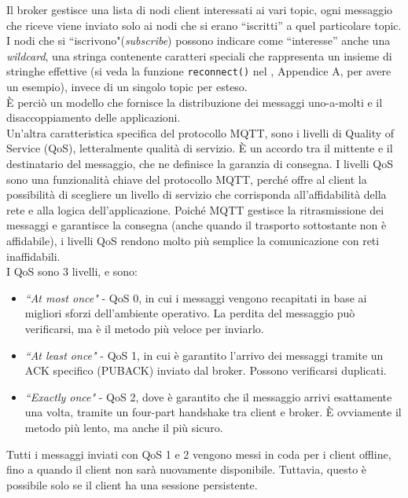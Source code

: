 \documentclass[12pt,a4paper]{report}
\begin{document}
Il broker gestisce una lista di nodi client interessati ai vari topic, ogni messaggio che riceve viene inviato solo ai nodi che si erano “iscritti” a quel particolare topic. I nodi che si ``iscrivono"(\textit{subscribe}) possono indicare come “interesse” anche una \textit{wildcard}, una stringa contenente caratteri speciali che rappresenta un insieme di stringhe effettive (si veda la funzione \texttt{reconnect()} nel , Appendice A, per avere un esempio), invece di un singolo topic per esteso.\\
È perciò un modello che fornisce la distribuzione dei messaggi uno-a-molti e il disaccoppiamento delle applicazioni.\\

Un'altra caratteristica specifica del protocollo MQTT, sono i livelli di Quality of Service (QoS), letteralmente qualità di servizio. 
È un accordo tra il mittente e il destinatario del messaggio, che ne definisce la garanzia di consegna.
I livelli QoS sono una funzionalità chiave del protocollo MQTT, perché offre al client la possibilità di scegliere un livello di servizio che corrisponda all'affidabilità della rete e alla logica dell'applicazione. Poiché MQTT gestisce la ritrasmissione dei messaggi e garantisce la consegna (anche quando il trasporto sottostante non è affidabile), i livelli QoS rendono molto più semplice la comunicazione con reti inaffidabili.\\
I QoS sono 3 livelli, e sono: 
\begin{itemize}
	\item \textit{``At most once"} - QoS 0, in cui i messaggi vengono recapitati in base ai migliori sforzi dell'ambiente operativo. La perdita del messaggio può verificarsi, ma è il metodo più veloce per inviarlo. 
	
	\item \textit{``At least once"} - QoS 1, in cui è garantito l'arrivo dei messaggi tramite un ACK specifico (PUBACK) inviato dal broker. Possono verificarsi duplicati.
	
	\item \textit{``Exactly once"} - QoS 2, dove è garantito che il messaggio arrivi esattamente una volta, tramite un four-part handshake tra client e broker. È ovviamente il metodo più lento, ma anche il più sicuro.
\end{itemize}

Tutti i messaggi inviati con QoS 1 e 2 vengono messi in coda per i client offline, fino a quando il client non sarà nuovamente disponibile. Tuttavia, questo è possibile solo se il client ha una sessione persistente.\\
\end{document}

